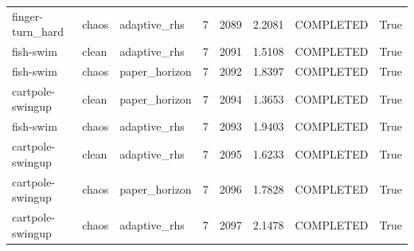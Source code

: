 \begin{tabular}{llllllll}
finger-turn\_hard & chaos & adaptive\_rhs & 7 & 2089 & 2.2081 & COMPLETED & True \\
fish-swim & clean & adaptive\_rhs & 7 & 2091 & 1.5108 & COMPLETED & True \\
fish-swim & chaos & paper\_horizon & 7 & 2092 & 1.8397 & COMPLETED & True \\
cartpole-swingup & clean & paper\_horizon & 7 & 2094 & 1.3653 & COMPLETED & True \\
fish-swim & chaos & adaptive\_rhs & 7 & 2093 & 1.9403 & COMPLETED & True \\
cartpole-swingup & clean & adaptive\_rhs & 7 & 2095 & 1.6233 & COMPLETED & True \\
cartpole-swingup & chaos & paper\_horizon & 7 & 2096 & 1.7828 & COMPLETED & True \\
cartpole-swingup & chaos & adaptive\_rhs & 7 & 2097 & 2.1478 & COMPLETED & True \\
\bottomrule
\end{tabular}
